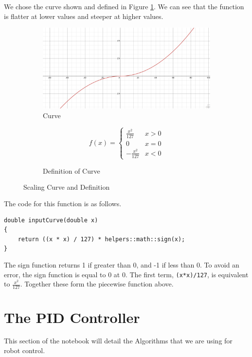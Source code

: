\documentclass[12pt]{report}
\begin{document}
We chose the curve shown and defined in Figure \ref{FIG::scalCurve}.
We can see that the function is flatter at lower values and steeper at higher values.
\begin{figure}[h]

    \centering
    \begin{subfigure}[][][c]{0.7\textwidth}
        \centering
        \includegraphics[scale=0.25]{figures/scalingCurve.png}
        \caption{Curve}
    \end{subfigure}%
    \begin{subfigure}[][][c]{0.3\textwidth}
        \centering
        $$
        f(x) = 
            \begin{cases}
                \frac{x^2}{127} & x>0 \\
                0 & x=0 \\
                -\frac{x^2}{127} & x<0
            \end{cases}
        $$        
        \caption{Definition of Curve}
    \end{subfigure}

    \label{FIG::scalCurve}
    \caption{Scaling Curve and Definition}

\end{figure}

The code for this function is as follows.
\begin{verbatim}
double inputCurve(double x) 
{
    return ((x * x) / 127) * helpers::math::sign(x);
}
\end{verbatim}
The sign function returns 1 if greater than 0, and -1 if less than 0.
To avoid an error, the sign function is equal to 0 at 0.
The first term, \verb|(x*x)/127|, is equivalent to $\frac{x^2}{127}$.
Together these form the piecewise function above.

\chapter{The PID Controller}
This section of the notebook will detail the Algorithms that we are using for robot control.
\end{document}
